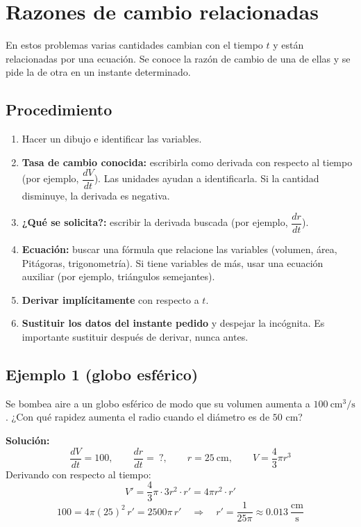 \documentclass[12pt]{article}
\begin{document}
\section{Razones de cambio relacionadas}

En estos problemas varias cantidades cambian con el tiempo $t$ y están relacionadas por una ecuación. Se conoce la razón de cambio de una de ellas y se pide la de otra en un instante determinado.

\subsection{Procedimiento}

\begin{enumerate}
    \item Hacer un dibujo e identificar las variables.
    \item \textbf{Tasa de cambio conocida:} escribirla como derivada con respecto al tiempo (por ejemplo, $\dfrac{dV}{dt}$). Las unidades ayudan a identificarla. Si la cantidad disminuye, la derivada es negativa.
    \item \textbf{¿Qué se solicita?:} escribir la derivada buscada (por ejemplo, $\dfrac{dr}{dt}$).
    \item \textbf{Ecuación:} buscar una fórmula que relacione las variables (volumen, área, Pitágoras, trigonometría). Si tiene variables de más, usar una ecuación auxiliar (por ejemplo, triángulos semejantes).
    \item \textbf{Derivar implícitamente} con respecto a $t$.
    \item \textbf{Sustituir los datos del instante pedido} y despejar la incógnita. Es importante sustituir después de derivar, nunca antes.
\end{enumerate}

\subsection{Ejemplo 1 (globo esférico)}
Se bombea aire a un globo esférico de modo que su volumen aumenta a $100\ \text{cm}^3/\text{s}$. ¿Con qué rapidez aumenta el radio cuando el diámetro es de $50$ cm?

\textbf{Solución:}
\[
\frac{dV}{dt} = 100, \qquad \frac{dr}{dt} = \ ?, \qquad r = 25\ \text{cm}, \qquad V = \frac{4}{3}\pi r^3
\]
Derivando con respecto al tiempo:
\[
V' = \frac{4}{3}\pi \cdot 3r^2 \cdot r' = 4\pi r^2 \cdot r'
\]
\[
100 = 4\pi (25)^2 \, r' = 2500\pi \, r' \quad \Rightarrow \quad r' = \frac{1}{25\pi} \approx 0.013\ \frac{\text{cm}}{\text{s}}
\]
\end{document}
